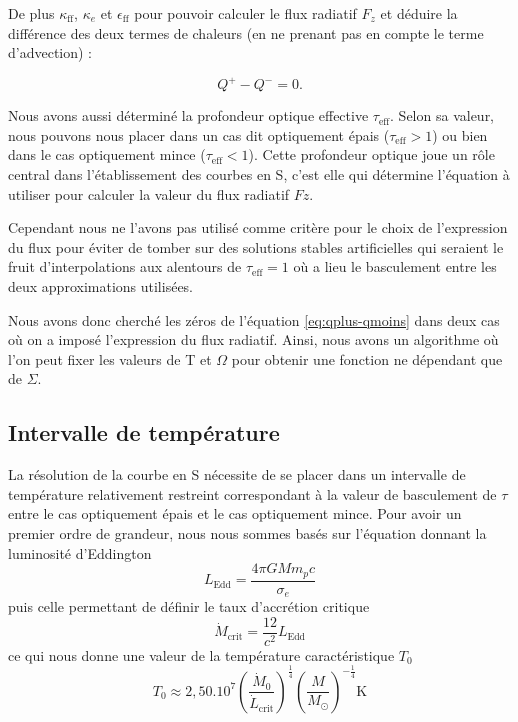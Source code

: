 De plus $\kappa_\textrm{ff}$, $\kappa_{e}$ et $\epsilon_\textrm{ff}$ pour pouvoir calculer le flux radiatif $F_z$ et déduire la différence des deux termes de chaleurs (en ne prenant pas en compte le terme d'advection) :

\begin{equation} 
\label{eq:qplus-qmoins}
Q^+ - Q^- = 0. 
\end{equation}

Nous avons aussi déterminé la profondeur optique effective $\tau_\textrm{eff}$. Selon sa valeur, nous pouvons nous placer dans un cas dit optiquement épais ($\tau_\textrm{eff} > 1$) ou bien dans le cas optiquement mince  ($\tau_\textrm{eff} < 1$). Cette profondeur optique joue un rôle central dans l'établissement des courbes en S, c'est elle qui détermine l'équation à utiliser pour calculer la valeur du flux radiatif $Fz$.

Cependant nous ne l'avons pas utilisé comme critère pour le choix de l'expression du flux pour éviter de tomber sur des solutions stables artificielles qui seraient le fruit d'interpolations aux alentours de $\tau_\textrm{eff} = 1$ où a lieu le basculement entre les deux approximations utilisées. 

Nous avons donc cherché les zéros de l'équation \eqref{eq:qplus-qmoins} dans deux cas où on a imposé l'expression du flux radiatif. Ainsi, nous avons un algorithme où l'on peut fixer les valeurs de T et $\Omega$ pour obtenir une fonction ne dépendant que de $\Sigma$.

\subsection{Intervalle de température}
La résolution de la courbe en S nécessite de se placer dans un intervalle de température relativement restreint correspondant à la valeur de basculement de $\tau$ entre le cas optiquement épais et le cas optiquement mince.
Pour avoir un premier ordre de grandeur, nous nous sommes basés sur l'équation donnant la luminosité d'Eddington 
\begin{equation}
L_\mathrm{Edd} = \frac{4\pi GMm_pc}{\sigma_e}
\end{equation}
puis celle permettant de définir le taux d’accrétion critique 
\begin{equation}
\dot{M}_\mathrm{crit} = \frac{12}{c^2}L_\mathrm{Edd} 
\end{equation}
ce qui nous donne une valeur de la température caractéristique $T_0$
\begin{equation}
T_0 \approx 2,50.10^7\left(\frac{\dot{M}_0}{\dot{L}_\mathrm{crit}}\right)^{\frac{1}{4}}\left(\frac{M}{M_\odot}\right)^{-\frac{1}{4}} \mathrm{K}
\end{equation}

